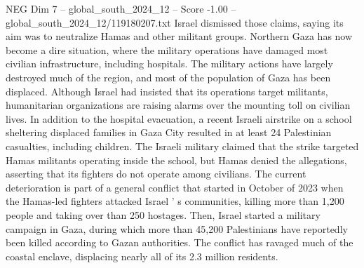 \begin{textsample}{NEG Dim 7 – global\_south\_2024\_12 – Score -1.00 – global\_south\_2024\_12/119180207.txt}
Israel dismissed those claims, saying its aim was to neutralize Hamas and other militant groups.
Northern Gaza has now become a dire situation, where the military operations have damaged most civilian infrastructure, including hospitals.
The military actions have largely destroyed much of the region, and most of the population of Gaza has been displaced.
Although Israel had insisted that its operations target militants, humanitarian organizations are raising alarms over the mounting toll on civilian lives.
In addition to the hospital evacuation, a recent Israeli airstrike on a school sheltering displaced families in Gaza City resulted in at least 24 Palestinian casualties, including children.
The Israeli military claimed that the strike targeted Hamas militants operating inside the school, but Hamas denied the allegations, asserting that its fighters do not operate among civilians.
The current deterioration is part of a general conflict that started in October of 2023 when the Hamas-led fighters attacked Israel ' s communities, killing more than 1,200 people and taking over than 250 hostages.
Then, Israel started a military campaign in Gaza, during which more than 45,200 Palestinians have reportedly been killed according to Gazan authorities.
The conflict has ravaged much of the coastal enclave, displacing nearly all of its 2.3 million residents.

\end{textsample}
